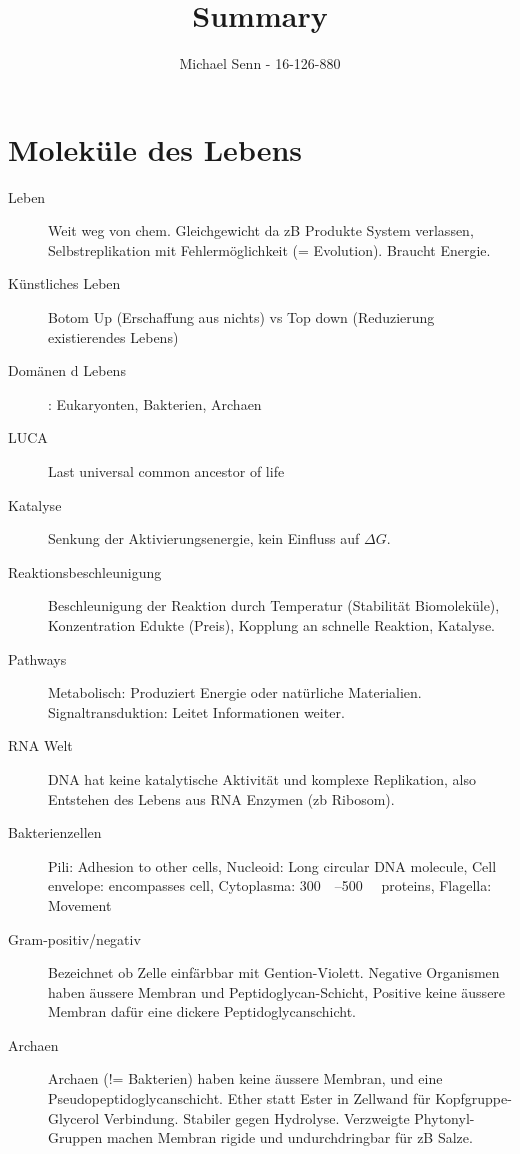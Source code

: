 \documentclass[a4paper,twocolumn,usegeometry,english,fontsize=6,DIV=16]{scrartcl}
\title{Summary}
\author{Michael Senn \maillink{michael.senn@students.unibe.ch} - 16-126-880}
\date{\printdate}
\begin{document}
 
\section{Moleküle des Lebens}

\begin{description}
	\item[Leben] Weit weg von chem. Gleichgewicht da zB Produkte System
		verlassen, Selbstreplikation mit Fehlermöglichkeit (=
		Evolution). Braucht Energie.
	\item[Künstliches Leben] Botom Up (Erschaffung aus nichts) vs Top down
		(Reduzierung existierendes Lebens)
	\item[Domänen d Lebens]: Eukaryonten, Bakterien, Archaen
	\item[LUCA] Last universal common ancestor of life
	\item[Katalyse] Senkung der Aktivierungsenergie, kein Einfluss auf
		$\Delta G$.
	\item[Reaktionsbeschleunigung] Beschleunigung der Reaktion durch
		Temperatur (Stabilität Biomoleküle), Konzentration Edukte
		(Preis), Kopplung an schnelle Reaktion, Katalyse.
	\item[Pathways] Metabolisch: Produziert Energie oder natürliche
		Materialien. Signaltransduktion: Leitet Informationen weiter.
	\item[RNA Welt] DNA hat keine katalytische Aktivität und komplexe
		Replikation, also Entstehen des Lebens aus RNA Enzymen (zb
		Ribosom).
	\item[Bakterienzellen] Pili: Adhesion to other cells, Nucleoid: Long
		circular DNA molecule, Cell envelope: encompasses cell,
		Cytoplasma: \SIrange{300}{500}{\milli\Molar} proteins,
		Flagella: Movement
	\item[Gram-positiv/negativ] Bezeichnet ob Zelle einfärbbar mit
		Gention-Violett. Negative Organismen haben äussere Membran und
		Peptidoglycan-Schicht, Positive keine äussere Membran dafür
		eine dickere Peptidoglycanschicht.
	\item[Archaen] Archaen (!= Bakterien) haben keine äussere Membran, und
		eine Pseudopeptidoglycanschicht. Ether statt Ester in Zellwand
		für Kopfgruppe-Glycerol Verbindung. Stabiler gegen Hydrolyse.
		Verzweigte Phytonyl-Gruppen machen Membran rigide und
		undurchdringbar für zB Salze.
\end{description}
\end{document}
